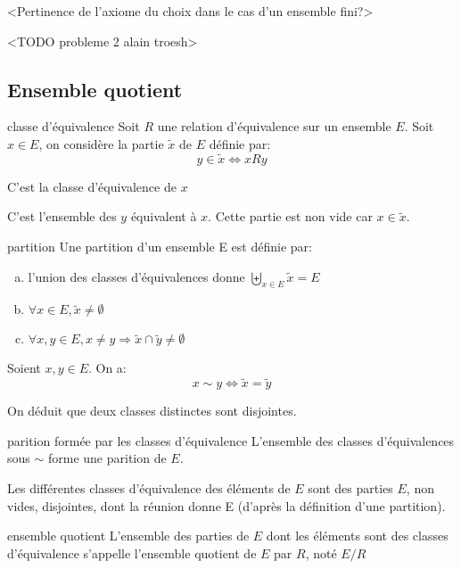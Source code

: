 <Pertinence de l'axiome du choix dans le cas d'un ensemble fini?>

<TODO probleme 2 alain troesh>

\subsection{Ensemble quotient}

\begin{definition}{classe d'équivalence}{}
    Soit $R$ une relation d'équivalence sur un ensemble $E$.
    Soit $x \in E$, on considère la partie $\tilde{x}$ de $E$ définie par:
    \[ y \in \tilde{x} \Leftrightarrow x R y \]

    \noindent
    C'est la classe d'équivalence de $x$
\end{definition}

C'est l'ensemble des $y$ équivalent à $x$. Cette partie est non vide car $x \in \tilde{x}$.

\begin{definition}{partition}{}
    Une partition d'un ensemble E est définie par:
    \begin{enumerate}[(a)]
        \item l'union des classes d'équivalences donne $\displaystyle \biguplus_{x \in E} \tilde{x} = E$
        \item $\forall x \in E, \tilde{x} \neq \emptyset$
        \item $\forall x, y \in E, x \neq y \Rightarrow \tilde{x} \cap \tilde{y} \neq \emptyset$
    \end{enumerate}
\end{definition}

\begin{lemma}{}{}
    Soient $x, y \in E$. On a:
    \[ x \sim y \Longleftrightarrow \tilde{x} = \tilde{y} \]
\end{lemma}

On déduit que deux classes distinctes sont disjointes.

\begin{theorem}{parition formée par les classes d'équivalence}{}
    L'ensemble des classes d'équivalences sous $\sim$ forme une parition de $E$.
\end{theorem}

Les différentes classes d'équivalence des éléments de $E$ sont des parties $E$, non vides, disjointes, dont la réunion donne E (d'après la définition d'une partition).

\begin{definition}{ensemble quotient}{}
    L'ensemble des parties de $E$ dont les éléments sont des classes d'équivalence s'appelle l'ensemble quotient de $E$ par $R$,
    noté $E/R$
\end{definition}

